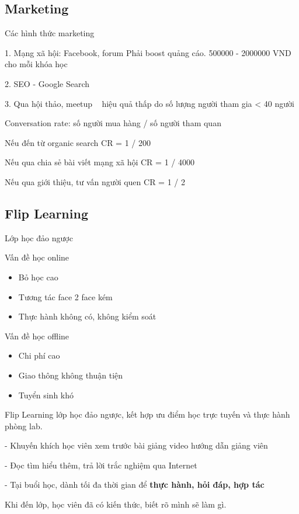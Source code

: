 \subsection{Marketing}

Các hình thức marketing

1. Mạng xã hội: Facebook, forum
Phải boost quảng cáo. 500000 - 2000000 VND cho mỗi khóa học

2. SEO - Google Search

3. Qua hội thảo, meetup ~ hiệu quả thấp do số lượng người tham gia < 40 người

Conversation rate: số người mua hàng / số người tham quan

Nếu đến từ organic search CR = 1 / 200

Nếu qua chia sẻ bài viết mạng xã hội CR = 1 / 4000

Nếu qua giới thiệu, tư vấn người quen CR = 1 / 2

\subsection{Flip Learning}

Lớp học đảo ngược

Vấn đề học online

\begin{itemize}
  \item Bỏ học cao
  \item Tương tác face 2 face kém
  \item Thực hành không có, không kiểm soát
\end{itemize}

Vấn đề học offline

\begin{itemize}
  \item Chi phí cao
  \item Giao thông không thuận tiện
  \item Tuyển sinh khó
\end{itemize}

Flip Learning lớp học đảo ngược, kết hợp ưu điểm học trực tuyến và thực hành phòng lab.

- Khuyến khích học viên xem trước bài giảng video hướng dẫn giảng viên

- Đọc tìm hiểu thêm, trả lời trắc nghiệm qua Internet

- Tại buổi học, dành tối đa thời gian để \textbf{thực hành, hỏi đáp, hợp tác}

Khi đến lớp, học viên đã có kiến thức, biết rõ mình sẽ làm gì.

